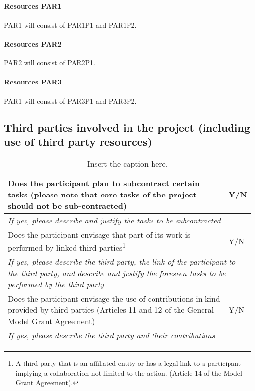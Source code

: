 
\paragraph{Resources PAR1}

PAR1 will consist of PAR1P1 and PAR1P2.

\paragraph{Resources PAR2}

PAR2 will consist of PAR2P1.

\paragraph{Resources PAR3}

PAR1 will consist of PAR3P1 and PAR3P2.

\subsection{Third parties involved in the project (including use of third party resources)}


\begin{savenotes}
\begin{table}[ht]
\begin{tabular}{|p{13cm}|p{2cm}|}\hline
Does the participant plan to subcontract certain tasks (please note that core tasks of the project should not be sub-contracted) & Y/N \\ \hline
\multicolumn{2}{|p{15cm}|}{\textit{If yes, please describe and justify the tasks to be subcontracted}} \\ \hline
%
Does the participant envisage that part of its work is performed by linked third parties\footnote{A third party that is an affiliated entity or has a legal link to a participant implying a collaboration not limited to the action. (Article 14 of the Model Grant Agreement).} & Y/N \\ \hline
\multicolumn{2}{|p{15cm}|}{\textit{If yes, please describe the third party, the link of the participant to the third party, and describe and justify the foreseen tasks to be performed by the third party}} \\ \hline
%
Does the participant envisage the use of contributions in kind provided by third parties (Articles 11 and 12 of the General Model Grant Agreement) & Y/N \\ \hline
\multicolumn{2}{|p{15cm}|}{\textit{If yes, please describe the third party and their contributions}} \\ \hline
\end{tabular}
\caption*{Insert the caption here.}
\end{table}
\end{savenotes}

